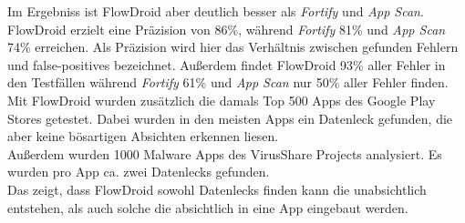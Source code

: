 \documentclass[runningheads]{llncs}
\begin{document}
Im Ergebniss ist FlowDroid aber deutlich besser als \emph{Fortify} und \emph{App Scan}. FlowDroid erzielt eine Präzision von 86\%, während \emph{Fortify} 81\% und \emph{App Scan} 74\% erreichen. Als Präzision wird hier das Verhältnis zwischen gefunden Fehlern und false-positives bezeichnet. Außerdem findet FlowDroid 93\% aller Fehler in den Testfällen während \emph{Fortify} 61\% und \emph{App Scan} nur 50\% aller Fehler finden. \\
Mit FlowDroid wurden zusätzlich die damals Top 500 Apps des Google Play Stores getestet. Dabei wurden in den meisten Apps ein Datenleck gefunden, die aber keine bösartigen Absichten erkennen liesen.\\
Außerdem wurden 1000 Malware Apps des VirusShare Projects analysiert. Es wurden pro App ca. zwei Datenlecks gefunden.\\
Das zeigt, dass FlowDroid sowohl Datenlecks finden kann die unabsichtlich entstehen, als auch solche die absichtlich in eine App eingebaut werden.
\end{document}
